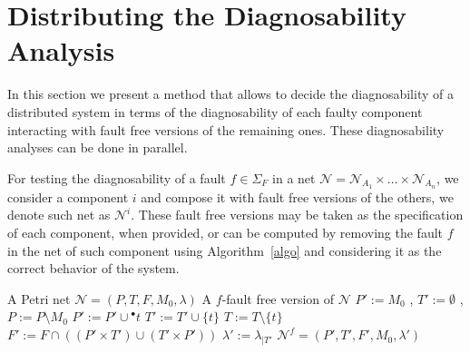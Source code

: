 \documentclass[a4paper]{article}
\newcommand\netn{{\mathcal{N}}}
\newcommand{\preset}[1]{{{}^\bullet{#1}}}
\begin{document}
\section{Distributing the Diagnosability Analysis} \label{sec:DDA}

In this section we present a method that allows to decide the diagnosability of a distributed system in terms of the diagnosability of each faulty component interacting with fault free versions of the remaining ones. These diagnosability analyses can be done in parallel.

For testing the diagnosability of a fault $f \in \Sigma_F$ in a net $\netn = \netn_{A_1}\times \dots \times \netn_{A_n}$, we consider a component $i$ and compose it with fault free versions of the others, we denote such net as $\netn^i$. These fault free versions may be taken as the specification of each component, when provided, or can be computed by removing the fault $f$ in the net of such component using Algorithm~\ref{algo} and considering it as the correct behavior of the system.

\begin{algorithm}[h]
\caption{}
  \begin{algorithmic}[1] \label{algo1}
    \REQUIRE A Petri net $\netn = (P, T, F, M_0, \lambda)$
    \ENSURE A $f$-fault free version of $\netn$
      \STATE $P' := M_0 $ , $T' := \emptyset$ , $P := P \setminus M_0$
      \WHILE{$\exists t \in T\backslash T': \preset t \subseteq P'$}
          \STATE $P' := P' \cup \preset t$
          \STATE $T' := T' \cup \{ t \}$
        \ENDIF
        \STATE $T := T \setminus \{ t \}$
      \ENDWHILE
    \STATE $F' := F \cap ((P' \times T') \cup (T' \times P'))$
    \STATE $\lambda' := \lambda_{\mid T'}$
    \RETURN $\netn^f = (P',T', F', M_0,\lambda')$
  \end{algorithmic}
  \label{algo}
\end{algorithm}
\end{document}
